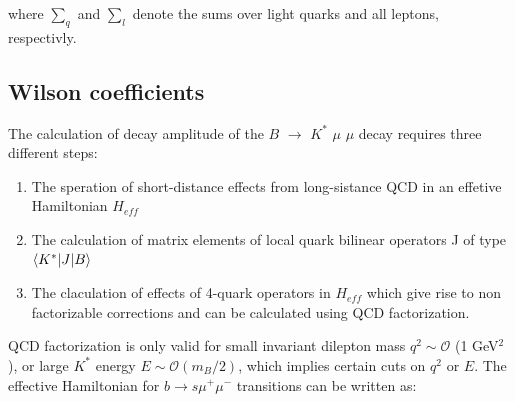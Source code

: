 \documentclass[english]{uzhpub}
\begin{document}
where $\sum_q$ and $\sum_l$ denote the sums over light quarks and all leptons, respectivly.




\subsection{Wilson coefficients}
The calculation of decay amplitude of the $B$ $\rightarrow$ $K^{*}$ $\mu$ $\mu$ decay requires three different steps:
\begin{enumerate}
  \item The speration of short-distance effects from long-sistance QCD in an effetive Hamiltonian $H_{eff}$
  \item The calculation of matrix elements of local quark bilinear operators J of type $\braket{ K^* | J | B }$
  \item The claculation of effects of 4-quark operators in $H_{eff}$ which give rise to non factorizable corrections and can be calculated using QCD factorization.
\end{enumerate}
QCD factorization is only valid for small invariant dilepton mass $ q^2 \sim \mathcal{O} $ (1 GeV$^2$),
or large $K^*$ energy $E \sim \mathcal{O}(m_B /2)$,
which implies certain cuts on $q^2$ or $E$. The effective Hamiltonian for $b \rightarrow s \mu^+ \mu^- $ transitions can be written as:
\end{document}
